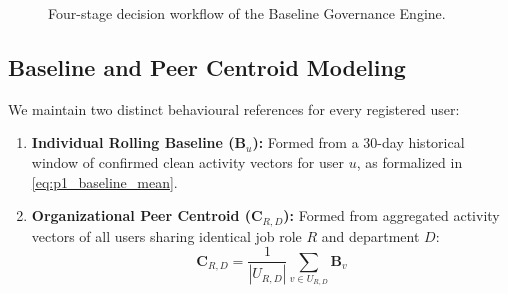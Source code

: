 \documentclass[conference]{IEEEtran}
\begin{document}
\begin{figure}[t]
\centering
{}
\caption{Four-stage decision workflow of the Baseline Governance Engine.}
\label{fig:governance_flow}
\end{figure}

\subsection{Baseline and Peer Centroid Modeling}
We maintain two distinct behavioural references for every registered user:
\begin{enumerate}
    \item \textbf{Individual Rolling Baseline ($\mathbf{B}_u$):} Formed from a 30-day historical window of confirmed clean activity vectors for user $u$, as formalized in \eqref{eq:p1_baseline_mean}.
    \item \textbf{Organizational Peer Centroid ($\mathbf{C}_{R,D}$):} Formed from aggregated activity vectors of all users sharing identical job role $R$ and department $D$:
    \begin{equation}
        \mathbf{C}_{R,D} = \frac{1}{|U_{R,D}|} \sum_{v \in U_{R,D}} \mathbf{B}_v
        \label{eq:p1_peer_centroid}
    \end{equation}
\end{enumerate}
\end{document}

